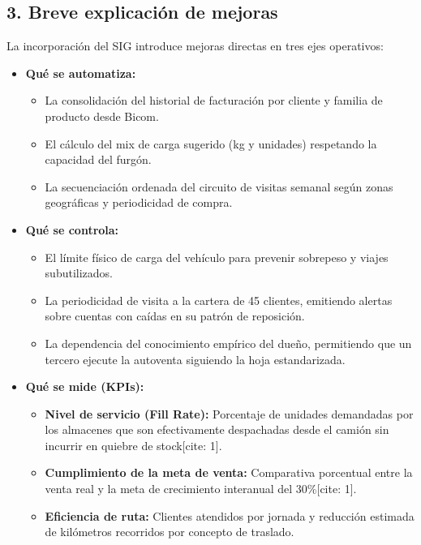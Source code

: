 \documentclass[10pt,a4paper]{article}
\begin{document}
\subsection*{3. Breve explicación de mejoras}

La incorporación del SIG introduce mejoras directas en tres ejes operativos:

\begin{itemize}[leftmargin=1.2cm]
    \item \textbf{Qué se automatiza:}
    \begin{itemize}
        \item La consolidación del historial de facturación por cliente y familia de producto desde Bicom.
        \item El cálculo del mix de carga sugerido (kg y unidades) respetando la capacidad del furgón.
        \item La secuenciación ordenada del circuito de visitas semanal según zonas geográficas y periodicidad de compra.
    \end{itemize}
    \item \textbf{Qué se controla:}
    \begin{itemize}
        \item El límite físico de carga del vehículo para prevenir sobrepeso y viajes subutilizados.
        \item La periodicidad de visita a la cartera de 45 clientes, emitiendo alertas sobre cuentas con caídas en su patrón de reposición.
        \item La dependencia del conocimiento empírico del dueño, permitiendo que un tercero ejecute la autoventa siguiendo la hoja estandarizada.
    \end{itemize}
    \item \textbf{Qué se mide (KPIs):}
    \begin{itemize}
        \item \textbf{Nivel de servicio (Fill Rate):} Porcentaje de unidades demandadas por los almacenes que son efectivamente despachadas desde el camión sin incurrir en quiebre de stock[cite: 1].
        \item \textbf{Cumplimiento de la meta de venta:} Comparativa porcentual entre la venta real y la meta de crecimiento interanual del 30\%[cite: 1].
        \item \textbf{Eficiencia de ruta:} Clientes atendidos por jornada y reducción estimada de kilómetros recorridos por concepto de traslado.
    \end{itemize}
\end{itemize}
\end{document}
